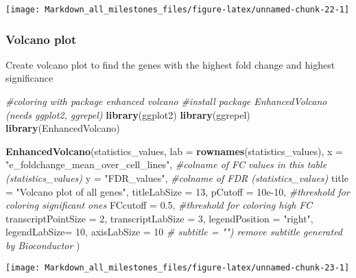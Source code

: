 \documentclass[]{article}
\newenvironment{Shaded}{\begin{snugshade}}{\end{snugshade}}
\newcommand{\CommentTok}[1]{\textcolor[rgb]{0.56,0.35,0.01}{\textit{#1}}}
\newcommand{\DataTypeTok}[1]{\textcolor[rgb]{0.13,0.29,0.53}{#1}}
\newcommand{\DecValTok}[1]{\textcolor[rgb]{0.00,0.00,0.81}{#1}}
\newcommand{\FloatTok}[1]{\textcolor[rgb]{0.00,0.00,0.81}{#1}}
\newcommand{\KeywordTok}[1]{\textcolor[rgb]{0.13,0.29,0.53}{\textbf{#1}}}
\newcommand{\NormalTok}[1]{#1}
\newcommand{\StringTok}[1]{\textcolor[rgb]{0.31,0.60,0.02}{#1}}
\begin{document}
\begin{center}\texttt{[image: Markdown\_all\_milestones\_files/figure-latex/unnamed-chunk-22-1]} \end{center}

\hypertarget{volcano-plot}{%
\subsubsection{Volcano plot}\label{volcano-plot}}

Create volcano plot to find the genes with the highest fold change and
highest significance

\begin{Shaded}
\begin{Highlighting}[]
\CommentTok{#coloring with package enhanced volcano}
\CommentTok{#install package EnhancedVolcano (needs ggplot2, ggrepel)}
\KeywordTok{library}\NormalTok{(ggplot2)}
\KeywordTok{library}\NormalTok{(ggrepel)}
\KeywordTok{library}\NormalTok{(EnhancedVolcano)}

\KeywordTok{EnhancedVolcano}\NormalTok{(statistics_values, }
                \DataTypeTok{lab =} \KeywordTok{rownames}\NormalTok{(statistics_values),}
                \DataTypeTok{x =} \StringTok{"e_foldchange_mean_over_cell_lines"}\NormalTok{, }
                \CommentTok{#colname of FC values in this table (statistics_values)}
                \DataTypeTok{y =} \StringTok{"FDR_values"}\NormalTok{, }\CommentTok{#colname of FDR (statistics_values)}
                \DataTypeTok{title =} \StringTok{"Volcano plot of all genes"}\NormalTok{,}
                \DataTypeTok{titleLabSize =} \DecValTok{13}\NormalTok{,}
                \DataTypeTok{pCutoff =} \FloatTok{10e-10}\NormalTok{, }\CommentTok{#threshold for coloring significant ones}
                \DataTypeTok{FCcutoff =} \FloatTok{0.5}\NormalTok{, }\CommentTok{#threshold for coloring high FC}
                \DataTypeTok{transcriptPointSize =} \DecValTok{2}\NormalTok{,}
                \DataTypeTok{transcriptLabSize =} \DecValTok{3}\NormalTok{,}
                \DataTypeTok{legendPosition =} \StringTok{"right"}\NormalTok{,}
                \DataTypeTok{legendLabSize=} \DecValTok{10}\NormalTok{,}
                \DataTypeTok{axisLabSize =} \DecValTok{10} 
                \CommentTok{# subtitle = "")  remove subtitle generated by Bioconductor}
\NormalTok{                 )}
\end{Highlighting}
\end{Shaded}

\begin{center}\texttt{[image: Markdown\_all\_milestones\_files/figure-latex/unnamed-chunk-23-1]} \end{center}
\end{document}
